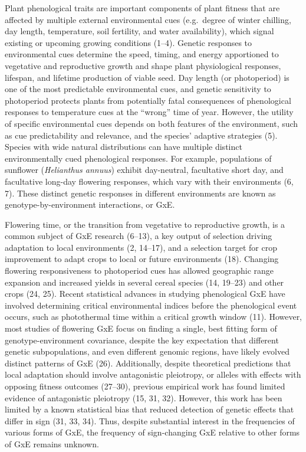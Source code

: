 \documentclass[
  9pt,
  twocolumn,
  twoside]{pnas-new}
\begin{document}
Plant phenological traits are important components of plant fitness that
are affected by multiple external environmental cues (e.g.~degree of
winter chilling, day length, temperature, soil fertility, and water
availability), which signal existing or upcoming growing conditions
(1--4). Genetic responses to environmental cues determine the speed,
timing, and energy apportioned to vegetative and reproductive growth and
shape plant physiological responses, lifespan, and lifetime production
of viable seed. Day length (or photoperiod) is one of the most
predictable environmental cues, and genetic sensitivity to photoperiod
protects plants from potentially fatal consequences of phenological
responses to temperature cues at the ``wrong'' time of year. However,
the utility of specific environmental cues depends on both features of
the environment, such as cue predictability and relevance, and the
species' adaptive strategies (5). Species with wide natural
distributions can have multiple distinct environmentally cued
phenological responses. For example, populations of sunflower
(\emph{Helianthus annuus}) exhibit day-neutral, facultative short day,
and facultative long-day flowering responses, which vary with their
environments (6, 7). These distinct genetic responses in different
environments are known as genotype-by-environment interactions, or GxE.

Flowering time, or the transition from vegetative to reproductive
growth, is a common subject of GxE research (6--13), a key output of
selection driving adaptation to local environments (2, 14--17), and a
selection target for crop improvement to adapt crops to local or future
environments (18). Changing flowering responsiveness to photoperiod cues
has allowed geographic range expansion and increased yields in several
cereal species (14, 19--23) and other crops (24, 25). Recent statistical
advances in studying phenological GxE have involved determining critical
environmental indices before the phenological event occurs, such as
photothermal time within a critical growth window (11). However, most
studies of flowering GxE focus on finding a single, best fitting form of
genotype-environment covariance, despite the key expectation that
different genetic subpopulations, and even different genomic regions,
have likely evolved distinct patterns of GxE (26). Additionally, despite
theoretical predictions that local adaptation should involve
antagonistic pleiotropy, or alleles with effects with opposing fitness
outcomes (27--30), previous empirical work has found limited evidence of
antagonistic pleiotropy (15, 31, 32). However, this work has been
limited by a known statistical bias that reduced detection of genetic
effects that differ in sign (31, 33, 34). Thus, despite substantial
interest in the frequencies of various forms of GxE, the frequency of
sign-changing GxE relative to other forms of GxE remains unknown.
\end{document}
